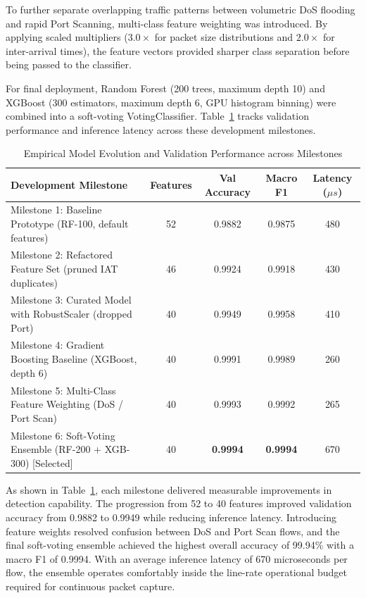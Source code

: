 \documentclass[12pt,a4paper]{report}
\begin{document}
To further separate overlapping traffic patterns between volumetric DoS flooding and rapid Port Scanning, multi-class feature weighting was introduced. By applying scaled multipliers ($3.0\times$ for packet size distributions and $2.0\times$ for inter-arrival times), the feature vectors provided sharper class separation before being passed to the classifier.

For final deployment, Random Forest (200 trees, maximum depth 10) and XGBoost (300 estimators, maximum depth 6, GPU histogram binning) were combined into a soft-voting VotingClassifier. Table~\ref{tab:hyperparameter_tuning} tracks validation performance and inference latency across these development milestones.

\begin{table}[H]
\centering
\renewcommand{\arraystretch}{1.2}
\begin{tabularx}{\textwidth}{|X|c|c|c|c|}
\hline
\textbf{Development Milestone} & \textbf{Features} & \textbf{Val Accuracy} & \textbf{Macro F1} & \textbf{Latency ($\mu s$)} \\
\hline
Milestone 1: Baseline Prototype (RF-100, default features) & 52 & 0.9882 & 0.9875 & 480 \\
\hline
Milestone 2: Refactored Feature Set (pruned IAT duplicates) & 46 & 0.9924 & 0.9918 & 430 \\
\hline
Milestone 3: Curated Model with RobustScaler (dropped Port) & 40 & 0.9949 & 0.9958 & 410 \\
\hline
Milestone 4: Gradient Boosting Baseline (XGBoost, depth 6) & 40 & 0.9991 & 0.9989 & 260 \\
\hline
Milestone 5: Multi-Class Feature Weighting (DoS / Port Scan) & 40 & 0.9993 & 0.9992 & 265 \\
\hline
Milestone 6: Soft-Voting Ensemble (RF-200 + XGB-300) [Selected] & 40 & \textbf{0.9994} & \textbf{0.9994} & 670 \\
\hline
\end{tabularx}
\caption{Empirical Model Evolution and Validation Performance across Milestones}
\label{tab:hyperparameter_tuning}
\end{table}

As shown in Table~\ref{tab:hyperparameter_tuning}, each milestone delivered measurable improvements in detection capability. The progression from 52 to 40 features improved validation accuracy from 0.9882 to 0.9949 while reducing inference latency. Introducing feature weights resolved confusion between DoS and Port Scan flows, and the final soft-voting ensemble achieved the highest overall accuracy of 99.94\% with a macro F1 of 0.9994. With an average inference latency of 670 microseconds per flow, the ensemble operates comfortably inside the line-rate operational budget required for continuous packet capture.
\end{document}
